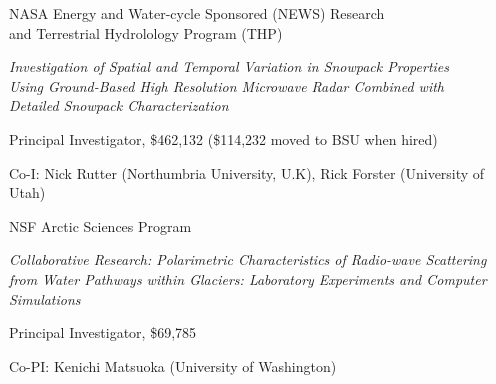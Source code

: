 \documentclass[11pt]{article}
\renewenvironment{itemize}{
  \begin{list}{}{
    \setlength{\leftmargin}{1.5em}
    \setlength{\itemsep}{0pt}
    \setlength{\parskip}{0pt}
  }
}{
  \end{list}
}
\begin{document}
\begin{itemize}
\item[08/2006-07/2009] NASA Energy and Water-cycle Sponsored (NEWS) Research \\
and Terrestrial Hydrolology Program (THP)
\begin{itemize}
  \item \textit{Investigation of Spatial and Temporal Variation in Snowpack Properties \\
  Using Ground-Based High Resolution Microwave Radar Combined with \\
  Detailed Snowpack Characterization}
  \item Principal Investigator, \$462,132 (\$114,232 moved to BSU when hired)
  \item Co-I: Nick Rutter (Northumbria University, U.K), Rick Forster (University of Utah)
\end{itemize}

\item[09/2005-08/2010] NSF Arctic Sciences Program
\begin{itemize}
  \item \textit{Collaborative Research: Polarimetric Characteristics of Radio-wave 
  Scattering from Water Pathways within Glaciers: Laboratory Experiments and Computer 
  Simulations}
  \item Principal Investigator, \$69,785
  \item Co-PI: Kenichi Matsuoka (University of Washington)
\end{itemize}
\end{itemize}

\pagebreak
\end{document}
